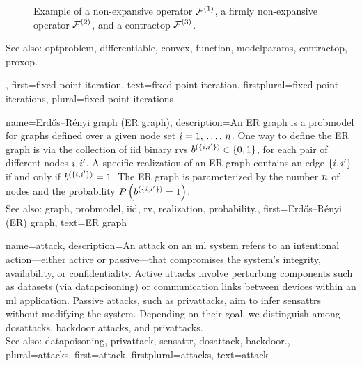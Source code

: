 {{\begin{figure}[H]
\begin{center}
			\end{center} 
			\caption{Example of a non-expansive operator $\mathcal{F}^{(1)}$, a firmly non-expansive operator $\mathcal{F}^{(2)}$, and 
				a \gls{contractop} $\mathcal{F}^{(3)}$. \label{fig_examples_nonexp_dict}}
		\end{figure} 
		See also: \gls{optproblem}, \gls{differentiable}, \gls{convex}, \gls{function}, \gls{modelparams}, \gls{contractop}, \gls{proxop}.},
	first={fixed-point iteration},
	text={fixed-point iteration},
	firstplural={fixed-point iterations}, 
	plural={fixed-point iterations}
}


{name={Erd\H{o}s–R\'enyi graph (ER graph)},
	description={An ER \gls{graph} is a \gls{probmodel} for \glspl{graph} defined over 
		a given node set $i=1, \,\ldots, \,n$. One way to define the ER \gls{graph} is 
		via the collection of \gls{iid} binary \glspl{rv} $b^{(\{i,i'\})} \in \{0,1\}$, 
		for each pair of different nodes $i, i'$. A specific \gls{realization}  
		of an ER \gls{graph} contains an edge $\{i,i'\}$ if and only if 
		$b^{(\{i,i'\})}=1$. The ER \gls{graph} is parameterized by the 
		number $n$ of nodes and the \gls{probability} $P\left(b^{(\{i,i'\})}=1\right)$. 
		\\
		See also: \gls{graph}, \gls{probmodel}, \gls{iid}, \gls{rv}, \gls{realization}, \gls{probability}.},
	first={Erd\H{o}s–R\'enyi (ER) graph},
	text={ER graph}
}

{name={attack},  
	description={An attack on an \gls{ml} system refers to an intentional action—either 
		active or passive—that compromises the system's integrity, availability, or confidentiality. 
		Active attacks involve perturbing components such as \glspl{dataset} (via \gls{datapoisoning}) 
		or communication links between \glspl{device} within an \gls{ml} application. Passive attacks, 
		such as \glspl{privattack}, aim to infer \glspl{sensattr} without modifying the system. 
		Depending on their goal, we distinguish among \glspl{dosattack}, \gls{backdoor} attacks, and \glspl{privattack}.
		\\
		See also: \gls{datapoisoning}, \gls{privattack}, \gls{sensattr}, \gls{dosattack}, \gls{backdoor}.},
	plural={attacks}, 
	first={attack},
	firstplural={attacks},
	text={attack}
}

